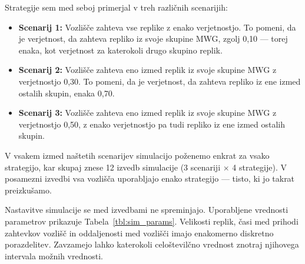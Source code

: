 \documentclass[a4paper, 12pt]{book}
\begin{document}
Strategije sem med seboj primerjal v treh različnih scenarijih:
\begin{itemize}
  \item \textbf{Scenarij 1:} Vozlišče zahteva vse replike z
    enako verjetnostjo. To pomeni, da je verjetnost, da zahteva repliko iz
    svoje skupine MWG, zgolj 0,10 --- torej enaka, kot verjetnost za
    katerokoli drugo skupino replik.

  \item \textbf{Scenarij 2:} Vozlišče zahteva eno izmed replik iz svoje
    skupine MWG z verjetnostjo 0,30. To pomeni, da je verjetnost, da
    zahteva repliko iz ene izmed ostalih skupin, enaka 0,70.

  \item \textbf{Scenarij 3:} Vozlišče zahteva eno izmed replik iz svoje
    skupine MWG z verjetnostjo 0,50, z enako verjetnostjo pa tudi repliko
    iz ene izmed ostalih skupin.
\end{itemize}
V vsakem izmed naštetih scenarijev simulacijo poženemo enkrat za vsako
strategijo, kar skupaj znese 12 izvedb simulacije
(3 scenariji $\times$ 4 strategije). V posamezni izvedbi vsa vozlišča
uporabljajo enako strategijo --- tisto, ki jo takrat preizkušamo.

Nastavitve simulacije se med izvedbami ne spreminjajo. Uporabljene vrednosti
parametrov prikazuje Tabela~\ref{tbl:sim_params}.
Velikosti replik, časi med prihodi zahtevkov vozlišč in oddaljenosti med
vozlišči imajo enakomerno diskretno porazdelitev. Zavzamejo lahko katerokoli
celoštevilčno vrednost znotraj njihovega intervala možnih vrednosti.
\end{document}
